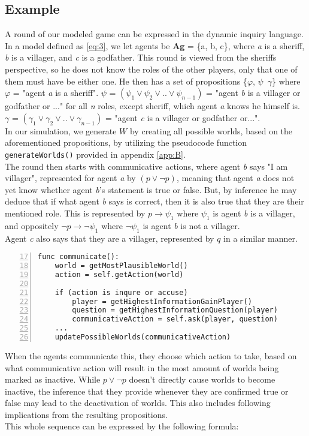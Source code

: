 \subsection{Example}
A round of our modeled game can be expressed in the dynamic inquiry language.
In a model defined as \cref{eq:3}, we let agents be \textbf{Ag} = \{a, b, c\},
where \textit{a} is a sheriff, \textit{b} is a villager, and \textit{c} is a
godfather. This round is viewed from the sheriffs perspective, so he does not
know the roles of the other players, only that one of them must have be either
one. He then has a set of propositions \{$\varphi$, $\psi$\, $\gamma$\} where
$\varphi$ = "agent \textit{a} is a sheriff". $\psi$ = $(\psi_1 \lor \psi_2 \lor
	.. \lor \psi_{n-1})$ = "agent \textit{b} is a villager or godfather or ..." for
all \textit{n} roles, except sheriff, which agent \textit{a} knows he himself
is. $\gamma$ = $(\gamma_1 \lor \gamma_2 \lor .. \lor \gamma_{n-1}) $ = "agent
\textit{c} is a villager or godfather or...". \\ In our simulation, we generate
$W$ by creating all possible worlds, based on the aforementioned propositions,
by utilizing the pseudocode function \lstinline{generateWorlds()} provided in
appendix \ref{app:B}. \\ The round then starts with communicative actions,
where agent \textit{b} says "I am villager", represented for agent \textit{a}
by $(p \lor \neg p)$, meaning that agent \textit{a} does not yet know whether
agent \textit{b}'s statement is true or false. But, by inference he may deduce
that if what agent \textit{b} says is correct, then it is also true that they
are their mentioned role. This is represented by $p \rightarrow \psi_1$ where
$\psi_1$ is agent \textit{b} is a villager, and oppositely $\neg p \rightarrow
	\neg \psi_1$ where $\neg \psi_1$ is agent \textit{b} is not a villager. \\
Agent \textit{c} also says that they are a villager, represented by $q$ in a
similar manner.

\begin{lstlisting}[basicstyle=\footnotesize\ttfamily, numbers=left, xleftmargin=0.5cm, firstnumber=17, caption={Snippet from appendix C}, captionpos=b]
func communicate():
	world = getMostPlausibleWorld()
	action = self.getAction(world)
	
	if (action is inqure or accuse)
		player = getHighestInformationGainPlayer()
		question = getHighestInformationQuestion(player)
		communicativeAction = self.ask(player, question)
	...
	updatePossibleWorlds(communicativeAction)
\end{lstlisting}\label{lst:communicate}
When the agents communicate this, they choose which action to take, based on
what communicative action will result in the most amount of worlds being marked
as inactive. While $p \lor \neg p$ doesn't directly cause worlds to become
inactive, the inference that they provide whenever they are confirmed true or
false may lead to the deactivation of worlds. This also includes following
implications from the resulting propositions.\\
This whole sequence can be expressed by the following formula:

